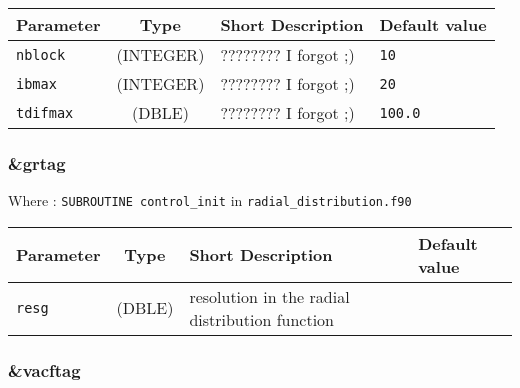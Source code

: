 \documentclass[a4paper]{article}
\begin{document}
\begin{longtable}{l|c|m{8cm}|m{2cm}}
\hline
\hline
Parameter        &  Type              &          Short Description                                                          & Default value \\
\hline
\hline
\rule[-0.75cm]{0cm}{1.5cm}
\verb?nblock?    & (INTEGER)          & ???????? I forgot ;)                                                                & \verb?10? \\
\hline
\rule[-0.75cm]{0cm}{1.5cm}
\verb?ibmax?     &  (INTEGER)         & ???????? I forgot ;)                                                                & \verb?20? \\
\hline
\rule[-0.75cm]{0cm}{1.5cm}
\verb?tdifmax?   & (DBLE)             & ???????? I forgot ;)                                                                & \verb?100.0? \\
\hline
\hline
\end{longtable}


\subsubsection{\&grtag}

Where : \verb?SUBROUTINE control_init? in \verb?radial_distribution.f90?
\newline

\begin{longtable}{l|c|m{8cm}|m{2cm}}
\hline
\hline
Parameter        &  Type              &          Short Description                                                          & Default value \\
\hline
\hline
\rule[-0.75cm]{0cm}{1.5cm}
\verb?resg?      & (DBLE)             & resolution in the radial distribution function                                      & \verb?? \\
\hline
\hline
\end{longtable}

\subsubsection{\&vacftag}
\end{document}
